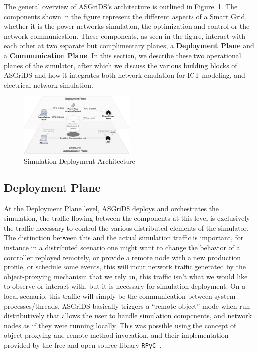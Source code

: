 \documentclass[conference]{IEEEtran}
\begin{document}
The general overview of ASGriDS's architecture is outlined in Figure~\ref{sens_arch}. The components shown in the figure represent the different aspects of a Smart Grid, whether it is the power networks simulation, the optimization and control or the network communication. These components, as seen in the figure, interact with each other at two separate but complimentary planes, a \textbf{Deployment Plane} and a \textbf{Communication Plane}.
In this section, we describe these two operational planes of the simulator, after which we discuss the various building blocks of ASGriDS and how it integrates both network emulation for ICT modeling, and electrical network simulation.

\begin{figure}[htp]
	\centering%
	\includegraphics[width=0.5\textwidth]{sens_arch.png}%
	\caption{Simulation Deployment Architecture}%
	\label{sens_arch}%
\end{figure}

\subsection{Deployment Plane}

At the Deployment Plane level, ASGriDS deploys and orchestrates the simulation, the traffic flowing between the components at this level is exclusively the traffic necessary to control the various distributed elements of the simulator. The distinction between this and the actual simulation traffic is important, for instance in a distributed scenario one might want to change the behavior of a controller reployed remotely, or provide a remote node with a new production profile, or schedule some events, this will incur network traffic generated by the object-proxying mechanism that we rely on, this traffic isn't what we would like to observe or interact with, but it is necessary for simulation deployment. On a local scenario, this traffic will simply be the communication between system processes/threads.
ASGriDS basically triggers a ``remote object'' mode when run distributively that allows the user to handle simulation components, and network nodes as if they were running locally. This was possible using the concept of object-proxying and remote method invocation, and their implementation provided by the free and open-source library \texttt{RPyC}~\cite{RPyCTransparentSymmetric}. 
\end{document}
